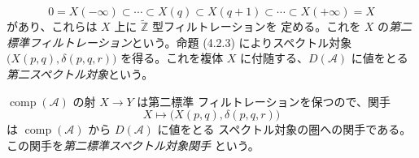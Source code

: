 \begin{equation}
0=X(-\infty)\subset\cdots\subset X(q)\subset X(q+1)
\subset\cdots\subset X(+\infty)=X
\tag{4.3.1.2}
\end{equation}
があり、これらは $X$ 上に $\widetilde{\mathbb Z}$ 型フィルトレーションを
定める。これを $X$ の\emph{第二標準フィルトレーション}という。命題
(4.2.3) によりスペクトル対象 $\bigl(X(p,q),\delta(p,q,r)\bigr)$ を得る。これを複体
$X$ に付随する、$D(\mathcal A)$ に値をとる\emph{第二スペクトル対象}という。

$\operatorname{comp}(\mathcal A)$ の射 $X\longrightarrow Y$ は第二標準
フィルトレーションを保つので、関手
\[
X\longmapsto\bigl(X(p,q),\delta(p,q,r)\bigr)
\]
は $\operatorname{comp}(\mathcal A)$ から $D(\mathcal A)$ に値をとる
スペクトル対象の圏への関手である。この関手を\emph{第二標準スペクトル対象関手}
という。
\endgroup
